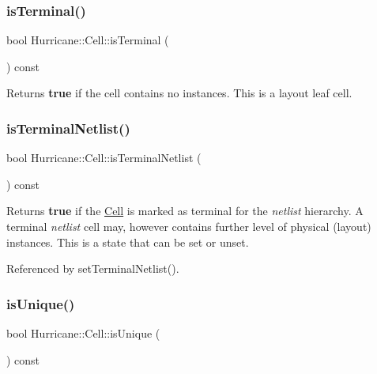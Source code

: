 \subsubsection{\texorpdfstring{is\+Terminal()}{isTerminal()}}
{\footnotesize\ttfamily bool Hurricane\+::\+Cell\+::is\+Terminal (\begin{DoxyParamCaption}{ }\end{DoxyParamCaption}) const\hspace{0.3cm}{\ttfamily [inline]}}

Returns {\bfseries true} if the cell contains no instances. This is a layout leaf cell. \mbox{\label{classHurricane_1_1Cell_a6fe2b5a80d4b344733416b25ea559497}} 
\subsubsection{\texorpdfstring{is\+Terminal\+Netlist()}{isTerminalNetlist()}}
{\footnotesize\ttfamily bool Hurricane\+::\+Cell\+::is\+Terminal\+Netlist (\begin{DoxyParamCaption}{ }\end{DoxyParamCaption}) const\hspace{0.3cm}{\ttfamily [inline]}}

Returns {\bfseries true} if the \mbox{\hyperlink{classHurricane_1_1Cell}{Cell}} is marked as terminal for the {\itshape netlist} hierarchy. A terminal {\itshape netlist} cell may, however contains further level of physical (layout) instances. This is a state that can be set or unset. 

Referenced by set\+Terminal\+Netlist().

\mbox{\label{classHurricane_1_1Cell_a6c2f2fd9f6f6e0578937a90c0c37a507}} 
\subsubsection{\texorpdfstring{is\+Unique()}{isUnique()}}
{\footnotesize\ttfamily bool Hurricane\+::\+Cell\+::is\+Unique (\begin{DoxyParamCaption}{ }\end{DoxyParamCaption}) const}

